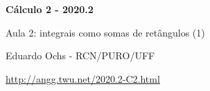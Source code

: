 \documentclass[oneside,12pt]{article}
\begin{document}


\long{}
\long{}
\long{}
\long{}
\long{}
\long{}
\long{}
\long{}
\long{}
\long{}

\long{}
\long{}

\def\frown{\ensuremath{{=}{(}}}
\def\True {\mathbf{V}}
\def\False{\mathbf{F}}

\def\drafturl{http://angg.twu.net/LATEX/2020-2-C2.pdf}
\def\drafturl{http://angg.twu.net/2020.2-C2.html}
\def\draftfooter{\tiny \href{\drafturl}{\jobname{}} \ColorBrown{\shorttoday{} \hours}}



%
%

\thispagestyle{empty}

\begin{center}

\vspace*{1.2cm}

{\bf \Large Cálculo 2 - 2020.2}

\bsk

Aula 2: integrais como somas de retângulos (1)

\bsk

Eduardo Ochs - RCN/PURO/UFF

\url{http://angg.twu.net/2020.2-C2.html}

\end{center}
\end{document}
